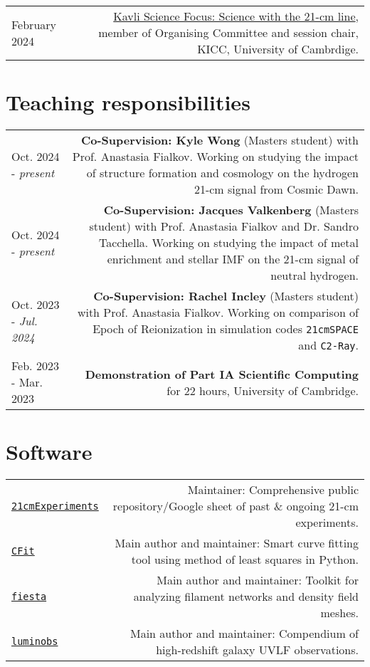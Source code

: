\documentclass{article}
\begin{document}
\begin{tabular}{L!{\vrule}R}
  February 2024  &\href{https://www.kicc.cam.ac.uk/events/kavli-science-themed-meetings/science-21-cm-hydrogen-line}{Kavli Science Focus: Science with the 21-cm line}, member of Organising Committee and session chair, KICC, University of Cambrdige. \\
\end{tabular}
\section*{Teaching responsibilities}

\begin{tabular}{L!{\vrule}R}

	Oct. 2024 - \textit{present} & \textbf{Co-Supervision: Kyle Wong} (Masters student) with Prof. Anastasia Fialkov.  Working on studying the impact of structure formation and cosmology on the hydrogen 21-cm signal from Cosmic Dawn. \\

	Oct. 2024 - \textit{present} & \textbf{Co-Supervision: Jacques Valkenberg} (Masters student) with Prof. Anastasia Fialkov and Dr. Sandro Tacchella. Working on studying the impact of metal enrichment and stellar IMF on the 21-cm signal of neutral hydrogen. \\

	Oct. 2023 - \textit{Jul. 2024} & \textbf{Co-Supervision: Rachel Incley} (Masters student) with Prof. Anastasia Fialkov. Working on comparison of Epoch of Reionization in simulation codes \texttt{21cmSPACE} and \texttt{C2-Ray}. \\

  Feb. 2023 - Mar. 2023 & \textbf{Demonstration of Part IA Scientific Computing} for 22 hours, University of Cambridge.\\

\end{tabular}

\section*{Software}

\begin{tabular}{L!{\vrule}R}
  \href{https://github.com/JitenDhandha/21cmExperiments}{\texttt{21cmExperiments}} & Maintainer: Comprehensive public repository/Google sheet of past \& ongoing 21-cm experiments. \\
	\href{https://github.com/JitenDhandha/CFit}{\texttt{CFit}} & Main author and maintainer: Smart curve fitting tool using method of least squares in Python.\\
	\href{https://fiesta-astro.readthedocs.io}{\texttt{fiesta}} & Main author and maintainer: Toolkit for analyzing filament networks and density field meshes. \\
	\href{https://github.com/JitenDhandha/luminobs}{\texttt{luminobs}} & Main author and maintainer: Compendium of high-redshift galaxy UVLF observations.\\
\end{tabular}
\end{document}
